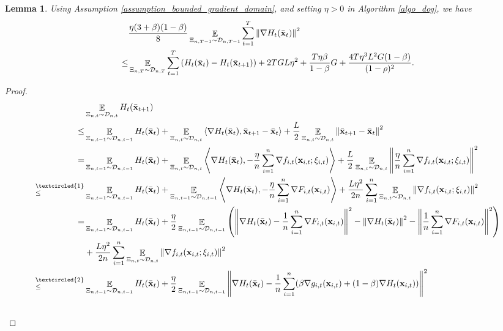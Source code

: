 \documentclass{article}
\newtheorem{Lemma}{\bf{Lemma}}
\begin{document}
\begin{Lemma}
\label{lemma_gradient_norm_bound}
Using Assumption \ref{assumption_bounded_gradient_domain}, and setting $\eta>0$ in Algorithm \ref{algo_dog}, we have 
\begin{align}
\nonumber
& \frac{\eta(3+\beta)(1-\beta)}{8}  \mathop{\mathbb{E}}_{ \Xi_{n,T-1} \sim \mathcal{D}_{n,T-1} }\sum_{t=1}^T\left\lVert\nabla H_t(\bar{{\bf x}}_t)\right\rVert^2 \\ \nonumber
\le & \mathop{\mathbb{E}}_{ \Xi_{n,T} \sim \mathcal{D}_{n,T} } \sum_{t=1}^T \left( H_t(\bar{{\bf x}}_t) - H_t(\bar{{\bf x}}_{t+1}) \right)  + 2TGL\eta^2  + \frac{T\eta \beta}{1-\beta}  G  + \frac{4T\eta^3 L^2 G(1-\beta)}{(1-\rho)^2}.
\end{align}
\end{Lemma}
\begin{proof}

\begin{align}
\nonumber
& \EE_{ \Xi_{n,t} \sim \Dcal_{n,t} } H_t(\bar{\x}_{t+1}) \\ \nonumber
\le & \EE_{ \Xi_{n,t-1} \sim \Dcal_{n,t-1} } H_t(\bar{\x}_t) + \EE_{ \Xi_{n,t} \sim \Dcal_{n,t} }\lrangle{\nabla H_t(\bar{\x}_t), \bar{\x}_{t+1} - \bar{\x}_t} + \frac{L}{2}\EE_{ \Xi_{n,t} \sim \Dcal_{n,t} }\lrnorm{\bar{\x}_{t+1} - \bar{\x}_t}^2 \\ \nonumber
= & \EE_{ \Xi_{n,t-1} \sim \Dcal_{n,t-1} } H_t(\bar{\x}_t) + \EE_{ \Xi_{n,t} \sim \Dcal_{n,t} }\lrangle{\nabla H_t(\bar{\x}_t), -\frac{\eta}{n}\sum_{i=1}^n \nabla f_{i,t}(\x_{i,t};\xi_{i,t})} + \frac{L}{2} \EE_{ \Xi_{n,t} \sim \Dcal_{n,t} }\lrnorm{\frac{\eta}{n}\sum_{i=1}^n \nabla f_{i,t}(\x_{i,t};\xi_{i,t})}^2 \\ \nonumber
\refabovecir{\le}{\textcircled{1}} & \EE_{ \Xi_{n,t-1} \sim \Dcal_{n,t-1} } H_t(\bar{\x}_t) + \EE_{ \Xi_{n,t-1} \sim \Dcal_{n,t-1} } \lrangle{\nabla H_t(\bar{\x}_t), -\frac{\eta}{n}\sum_{i=1}^n \nabla F_{i,t}(\x_{i,t})} + \frac{L\eta^2}{2n}\sum_{i=1}^n\EE_{ \Xi_{n,t} \sim \Dcal_{n,t} }\lrnorm{ \nabla f_{i,t}(\x_{i,t};\xi_{i,t})}^2 \\ \nonumber
= & \EE_{ \Xi_{n,t-1} \sim \Dcal_{n,t-1} } H_t(\bar{\x}_t) + \frac{\eta}{2}\EE_{ \Xi_{n,t-1} \sim \Dcal_{n,t-1} } \lrincir{ \lrnorm{\nabla H_t(\bar{\x}_t) -\frac{1}{n}\sum_{i=1}^n \nabla F_{i,t}(\x_{i,t})}^2 - \lrnorm{\nabla H_t(\bar{\x}_t)}^2 - \lrnorm{\frac{1}{n}\sum_{i=1}^n \nabla F_{i,t}(\x_{i,t})}^2 } \\ \nonumber 
& + \frac{L\eta^2}{2n}\sum_{i=1}^n\EE_{ \Xi_{n,t} \sim \Dcal_{n,t} }\lrnorm{ \nabla f_{i,t}(\x_{i,t};\xi_{i,t})}^2 \\ \nonumber
\refabovecir{\le}{\textcircled{2}} & \EE_{ \Xi_{n,t-1} \sim \Dcal_{n,t-1} } H_t(\bar{\x}_t) + \frac{\eta}{2}\EE_{ \Xi_{n,t-1} \sim \Dcal_{n,t-1} } \lrnorm{\nabla H_t(\bar{\x}_t) -\frac{1}{n}\sum_{i=1}^n (\beta \nabla g_{i,t}(\x_{i,t}) + (1-\beta)\nabla H_t(\x_{i,t}))}^2 \\ \nonumber 

\end{align}
\end{proof}
\end{document}
